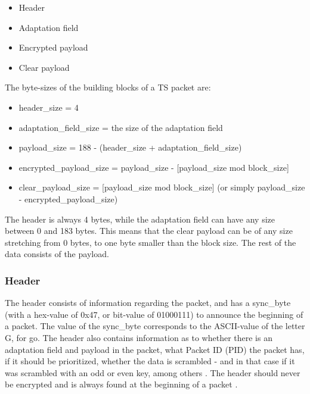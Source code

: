 \begin{itemize}
\item Header
\item Adaptation field
\item Encrypted payload
\item Clear payload
\end{itemize}

The byte-sizes of the building blocks of a TS packet are:

\begin{itemize}
\item header\_size = 4
\item adaptation\_field\_size = the size of the adaptation field
\item payload\_size = 188 - (header\_size + adaptation\_field\_size)
\item encrypted\_payload\_size = payload\_size - [payload\_size mod block\_size]
\item clear\_payload\_size = [payload\_size mod block\_size] 
  (or simply payload\_size - encrypted\_payload\_size)
\end{itemize}

The header is always 4 bytes, while the adaptation field can have any 
size between 0 and 183 bytes. This means that the clear payload can 
be of any size stretching from 0 bytes, to one byte smaller than the 
block size. The rest of the data consists of the payload.

\subsubsection{Header}
The header consists of information regarding the packet, and has a 
sync\_byte (with a hex-value of 0x47, or bit-value of 01000111) to 
announce the beginning of a packet. The value of the sync\_byte 
corresponds to the ASCII-value of the letter G, for go. 
The header also contains information as to whether there is an 
adaptation field and payload in the packet, what Packet ID (PID) the 
packet has, if it should be prioritized, whether the data is 
scrambled - and in that case if it was scrambled with an odd or even 
key, among others \citep[pp. 25--26]{etsiMPEG:2009}. The header should 
never be encrypted and is always found at the beginning of a packet 
\citep[pp. 10--11]{DVB:2013}.

